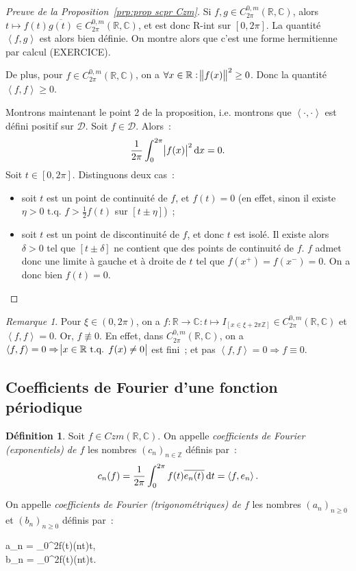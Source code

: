 \documentclass{report}
\theoremstyle{definition}
\newtheorem{déf}[thm]{Définition}
\theoremstyle{remark}
\newtheorem*{rmq}{Remarque}
\numberwithin{equation}{section}
\newcommand{\C}{\mathbb C}
\newcommand{\R}{\mathbb R}
\newcommand{\Z}{\mathbb Z}
\newcommand{\tq}{\text{ t.q. }}
\newcommand{\scpr}[2]{\left\langle #1, #2\right\rangle}
\newcommand{\CmT}[2]{C^{#1,m}_{#2}}
\newcommand{\CzmT}[1]{\CmT 0{#1}}
\newcommand{\Czm}{\CzmT{2\pi}}
\begin{document}
			\begin{proof}[Preuve de la Proposition~\ref{prp:prop scpr Czm}] Si $f, g \in \Czm(\R, \C)$, alors $t \mapsto f(t)\overline {g(t)} \in \Czm(\R, \C)$,
			et est donc R-int sur $[0, 2\pi]$. La quantité $\scpr fg$ est alors bien définie. On montre alors que c'est une forme hermitienne par calcul (EXERCICE).

			De plus, pour $f \in \Czm(\R, \C)$, on a $\forall x \in \R : \norm {f(x)}^2 \geq 0$. Donc la quantité $\scpr ff \geq 0$.

			Montrons maintenant le point 2 de la proposition, i.e. montrons que $\scpr \cdot\cdot$ est défini positif sur $\mathcal D$. Soit $f \in \mathcal D$.
			Alors~:
			\begin{equation}
				\frac 1{2\pi}\int_0^{2\pi}\abs {f(x)}^2\dif x = 0.
			\end{equation}
			Soit $t \in [0, 2\pi]$. Distinguons deux cas~:
			\begin{itemize}
				\item soit $t$ est un point de continuité de $f$, et $f(t) = 0$ (en effet, sinon il existe $\eta > 0 \tq f > \frac 12f(t)$ sur $[t \pm \eta]$)~;
				\item soit $t$ est un point de discontinuité de $f$, et donc $t$ est isolé. Il existe alors $\delta > 0$ tel que $[t \pm \delta]$ ne contient que des
				points de continuité de $f$. $f$ admet donc une limite à gauche et à droite de $t$ tel que $f(x^+) = f(x^-) = 0$. On a donc bien $f(t) = 0$.
			\end{itemize}
			\end{proof}

			\begin{rmq} Pour $\xi \in (0, 2\pi)$, on a $f : \R \to \C : t \mapsto I_{[x \in \xi + 2\pi\Z]} \in \Czm(\R, \C)$ et $\scpr ff = 0$. Or, $f \not \equiv 0$.
			En effet, dans $\Czm(\R, \C)$, on a $\scpr ff = 0 \Rightarrow \abs {x \in \R \tq f(x) \neq 0}$ est fini~; et pas $\scpr ff = 0 \Rightarrow f \equiv 0$.
			\end{rmq}

		\subsection{Coefficients de Fourier d'une fonction périodique}
			\begin{déf} Soit $f \in Czm(\R, \C)$. On appelle \textit{coefficients de Fourier (exponentiels) de $f$} les nombres $(c_n)_{n \in \Z}$ définis par~:
			\begin{equation}
				c_n(f) = \frac 1{2\pi}\int_0^{2\pi}f(t)\overline {e_n(t)}\dif t = \scpr f{e_n}.
			\end{equation}

			On appelle \textit{coefficients de Fourier (trigonométriques) de $f$} les nombres $(a_n)_{n \geq 0}$ et $(b_n)_{n \geq 0}$ définis par~:
			\begin{subnumcases}{}
				a_n = \pi\int_0^{2\pi}f(t)\cos(nt)\dif t, \\
				b_n = \pi\int_0^{2\pi}f(t)\sin(nt)\dif t.
			\end{subnumcases}
			\end{déf}
\end{document}
